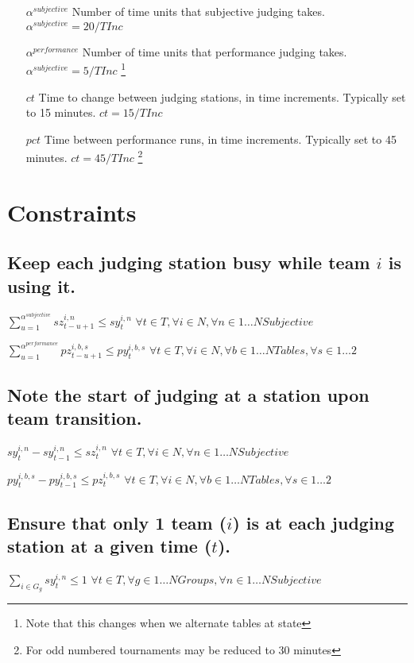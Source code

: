 \documentclass[letterpaper,11pt]{report}
\newcommand{\doccomment}[3]%
{\marginpar{\textcolor{#2}{\bf #1}}%
\footnote{{\color{#2}#3}}%
}
\newcommand{\doccomment}[3]{}
\newcommand{\jpscomment}[1]%
{\doccomment{SCHEWE}{Bittersweet}{#1}}
\begin{document}
\begin{itemize}
\item[$\alpha^{subjective}$] Number of time units that subjective judging
  takes. $\alpha^{subjective} = 20 / TInc$

\item[$\alpha^{performance}$] Number of time units that performance judging
  takes. $\alpha^{subjective} = 5 / TInc$ \jpscomment{Note that this
changes when we alternate tables at state}

\item[$ct$] Time to change between judging stations, in time increments. Typically set to 15
  minutes. $ct = 15/TInc$
\item[$pct$] Time between performance runs, in time increments. Typically set to 45
  minutes. $ct = 45/TInc$ \jpscomment{For odd numbered tournaments may be reduced to 30
    minutes}


\end{itemize}

\section{Constraints}

\subsection{Keep each judging station busy while team $i$ is using it.}

$\sum\limits_{u=1}^{\alpha^{subjective}} sz_{t-u+1}^{i,n} \le sy_{t}^{i,n}$
\hfill $\forall t \in T,  \forall i \in N,
\forall n \in 1 \dots NSubjective$

$\sum\limits_{u=1}^{\alpha^{performance}} pz_{t-u+1}^{i,b,s} \le py_{t}^{i,b,s}$
\hfill $\forall t \in T, \forall i \in N, \forall b \in 1 \dots NTables,
\forall s \in 1 \dots 2$


\subsection{Note the start of judging at a station upon team transition.}
$sy_{t}^{i,n} - sy_{t-1}^{i,n} \le sz_{t}^{i,n}$
\hfill $\forall t \in T, \forall i \in N,
\forall n \in 1 \dots NSubjective$

$py_{t}^{i,b,s} - py_{t-1}^{i,b,s} \le pz_{t}^{i,b,s}$
\hfill $\forall t \in T, \forall i \in N, \forall b \in 1 \dots NTables,
\forall s \in 1 \dots 2$


\subsection{Ensure that only 1 team ($i$) is at each judging station at a
given time ($t$).}
\label{judging_group_constraint}
$\sum\limits_{i \in G_{g}} sy_{t}^{i,n} \le 1$          
\hfill $\forall t \in T, \forall g \in 1 \dots NGroups,
\forall n \in 1 \dots NSubjective$
\end{document}
